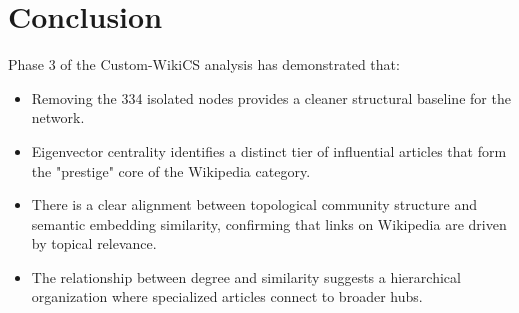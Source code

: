 \documentclass[12pt,a4paper]{article}
\begin{document}
\section{Conclusion}

Phase 3 of the Custom-WikiCS analysis has demonstrated that:
\begin{itemize}
    \item Removing the 334 isolated nodes provides a cleaner structural baseline for the network.
    \item Eigenvector centrality identifies a distinct tier of influential articles that form the "prestige" core of the Wikipedia category.
    \item There is a clear alignment between topological community structure and semantic embedding similarity, confirming that links on Wikipedia are driven by topical relevance.
    \item The relationship between degree and similarity suggests a hierarchical organization where specialized articles connect to broader hubs.
\end{itemize}
\end{document}
